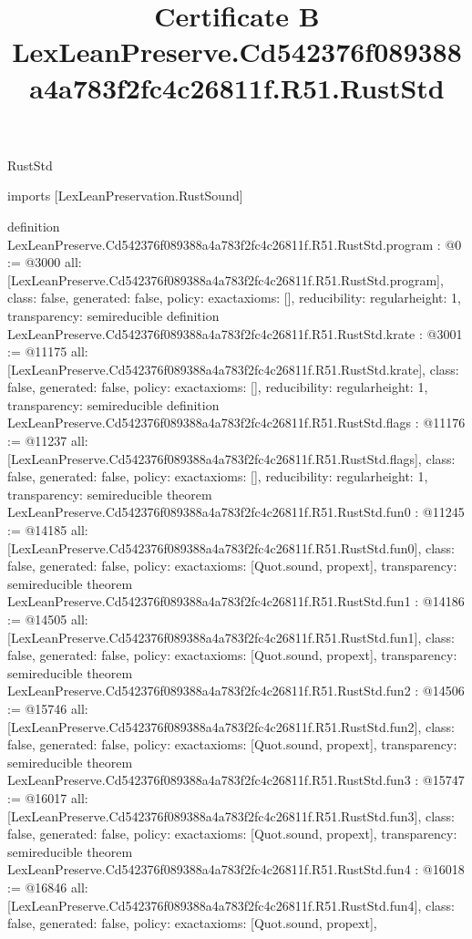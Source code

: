 \begin{lexlean}{RustStd}
\title{Certificate B LexLeanPreserve.Cd542376f089388a4a783f2fc4c26811f.R51.RustStd}
\begin{coremodule}
imports [LexLeanPreservation.RustSound]

definition LexLeanPreserve.Cd542376f089388a4a783f2fc4c26811f.R51.RustStd.program : @0 := @3000 {
  all: [LexLeanPreserve.Cd542376f089388a4a783f2fc4c26811f.R51.RustStd.program],
  class: false,
  generated: false,
  policy: exact{axioms: []},
  reducibility: regular{height: 1},
  transparency: semireducible
}
definition LexLeanPreserve.Cd542376f089388a4a783f2fc4c26811f.R51.RustStd.krate : @3001 := @11175 {
  all: [LexLeanPreserve.Cd542376f089388a4a783f2fc4c26811f.R51.RustStd.krate],
  class: false,
  generated: false,
  policy: exact{axioms: []},
  reducibility: regular{height: 1},
  transparency: semireducible
}
definition LexLeanPreserve.Cd542376f089388a4a783f2fc4c26811f.R51.RustStd.flags : @11176 := @11237 {
  all: [LexLeanPreserve.Cd542376f089388a4a783f2fc4c26811f.R51.RustStd.flags],
  class: false,
  generated: false,
  policy: exact{axioms: []},
  reducibility: regular{height: 1},
  transparency: semireducible
}
theorem LexLeanPreserve.Cd542376f089388a4a783f2fc4c26811f.R51.RustStd.fun0 : @11245 := @14185 {
  all: [LexLeanPreserve.Cd542376f089388a4a783f2fc4c26811f.R51.RustStd.fun0],
  class: false,
  generated: false,
  policy: exact{axioms: [Quot.sound, propext]},
  transparency: semireducible
}
theorem LexLeanPreserve.Cd542376f089388a4a783f2fc4c26811f.R51.RustStd.fun1 : @14186 := @14505 {
  all: [LexLeanPreserve.Cd542376f089388a4a783f2fc4c26811f.R51.RustStd.fun1],
  class: false,
  generated: false,
  policy: exact{axioms: [Quot.sound, propext]},
  transparency: semireducible
}
theorem LexLeanPreserve.Cd542376f089388a4a783f2fc4c26811f.R51.RustStd.fun2 : @14506 := @15746 {
  all: [LexLeanPreserve.Cd542376f089388a4a783f2fc4c26811f.R51.RustStd.fun2],
  class: false,
  generated: false,
  policy: exact{axioms: [Quot.sound, propext]},
  transparency: semireducible
}
theorem LexLeanPreserve.Cd542376f089388a4a783f2fc4c26811f.R51.RustStd.fun3 : @15747 := @16017 {
  all: [LexLeanPreserve.Cd542376f089388a4a783f2fc4c26811f.R51.RustStd.fun3],
  class: false,
  generated: false,
  policy: exact{axioms: [Quot.sound, propext]},
  transparency: semireducible
}
theorem LexLeanPreserve.Cd542376f089388a4a783f2fc4c26811f.R51.RustStd.fun4 : @16018 := @16846 {
  all: [LexLeanPreserve.Cd542376f089388a4a783f2fc4c26811f.R51.RustStd.fun4],
  class: false,
  generated: false,
  policy: exact{axioms: [Quot.sound, propext]},
}
\end{coremodule}
\end{lexlean}
